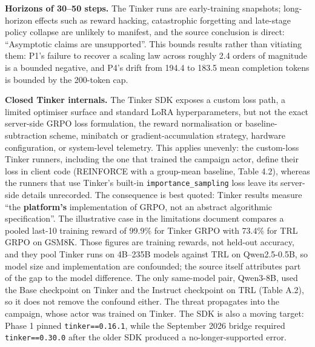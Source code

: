 \documentclass[12pt,a4paper]{report}
\begin{document}
\textbf{Horizons of 30--50 steps.} The Tinker runs are early-training
snapshots; long-horizon effects such as reward hacking, catastrophic
forgetting and late-stage policy collapse are unlikely to manifest, and
the source conclusion is direct: ``Asymptotic claims are unsupported''.
This bounds results rather than vitiating them: P1's failure to recover
a scaling law across roughly 2.4 orders of magnitude is a bounded
negative, and P4's drift from 194.4 to 183.5 mean completion tokens is
bounded by the 200-token cap.

\textbf{Closed Tinker internals.} The Tinker SDK exposes a custom loss
path, a limited optimiser surface and standard LoRA hyperparameters, but
not the exact server-side GRPO loss formulation, the reward
normalisation or baseline-subtraction scheme, minibatch or
gradient-accumulation strategy, hardware configuration, or system-level
telemetry. This applies unevenly: the custom-loss Tinker runners,
including the one that trained the campaign actor, define their loss in
client code (REINFORCE with a group-mean baseline, Table 4.2), whereas
the runners that use Tinker's built-in \texttt{importance\_sampling}
loss leave its server-side details unrecorded. The consequence is best
quoted: Tinker results measure ``the \textbf{platform's} implementation
of GRPO, not an abstract algorithmic specification''. The illustrative
case in the limitations document compares a pooled last-10 training
reward of 99.9\% for Tinker GRPO with 73.4\% for TRL GRPO on GSM8K.
Those figures are training rewards, not held-out accuracy, and they pool
Tinker runs on 4B--235B models against TRL on Qwen2.5-0.5B, so model
size and implementation are confounded; the source itself attributes
part of the gap to the model difference. The only same-model pair,
Qwen3-8B, used the Base checkpoint on Tinker and the Instruct checkpoint
on TRL (Table A.2), so it does not remove the confound either. The
threat propagates into the campaign, whose actor was trained on Tinker.
The SDK is also a moving target: Phase 1 pinned \texttt{tinker==0.16.1},
while the September 2026 bridge required \texttt{tinker==0.30.0} after
the older SDK produced a no-longer-supported error.
\end{document}
